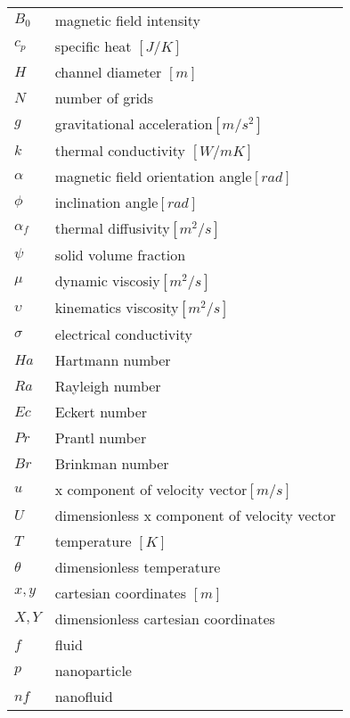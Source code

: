 \hspace{-3mm}
\begin{tabular}{p{2cm}l}
{\bf{$B_{0}$}}&{magnetic field intensity}\\
{\bf{${{c}_{p}}$}}&{specific heat $\left[ J / K \right]$}\\
{\bf{$H$}}&{channel diameter $[m]$}\\
{\bf{$N$}}&{number of grids}\\
{\bf{$g$}}&{gravitational acceleration$\left[ m / {{s}^{2}} \right]$}\\
{\bf{$k$}}&{thermal conductivity $[W / mK]$}\\
{\bf{$\alpha $}}&{magnetic field orientation angle$\left[ rad \right]$ }\\
{\bf{$\phi $}}&{inclination angle$\left[ rad \right]$ }\\
{\bf{$\alpha_f $}}&{thermal diffusivity$\left[ {{m}^{2}}/s \right]$ }\\
{\bf{$\psi $}}&{solid volume fraction}\\
{\bf{$\mu $}}&{dynamic viscosiy$\left[ {{m}^{2}}/s \right]$}\\
{\bf{$\upsilon $ }}&{kinematics viscosity$\left[ {{m}^{2}}/s \right]$}\\
{\bf{$\sigma $ }}&{electrical conductivity}\\
{\bf{$Ha$}}&{Hartmann number}\\
{\bf{$Ra$}}&{Rayleigh number}\\
{\bf{$Ec$}}&{Eckert number}\\
{\bf{$Pr$}}&{Prantl number}\\
{\bf{$Br$}}&{Brinkman number}\\
{\bf{$u$}}&{x component of velocity vector$\left[ m / {s} \right ]$}\\
{\bf{$U$}}&{dimensionless x component of velocity vector}\\
{\bf{$T$}}&{temperature $[K]$}\\
{\bf{$\theta$}}&{dimensionless temperature}\\
{\bf{$x,y$}}&{cartesian coordinates $[m]$}\\
{\bf{$X,Y$}}&{dimensionless cartesian coordinates}\\
{\bf{$f$}}&{fluid}\\
{\bf{$p$}}&{nanoparticle}\\
{\bf{$nf$}}&{nanofluid}\\
\end{tabular}

